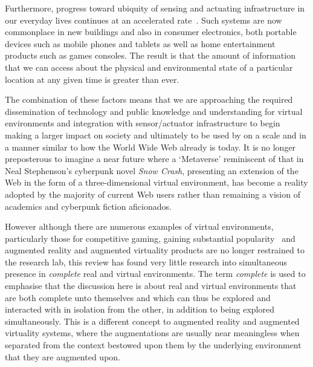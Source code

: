 Furthermore, progress toward ubiquity of sensing and actuating infrastructure in our everyday lives continues at an accelerated rate~\cite{Bose2009, Baronti2007}. Such systems are now commonplace in new buildings and also in consumer electronics, both portable devices such as mobile phones and tablets as well as home entertainment products such as games consoles. The result is that the amount of information that we can access about the physical and environmental state of a particular location at any given time is greater than ever.

The combination of these factors means that we are approaching the required dissemination of technology and public knowledge and understanding for virtual environments and integration with sensor/actuator infrastructure to begin making a larger impact on society and ultimately to be used by on a scale and in a manner similar to how the World Wide Web already is today. It is no longer preposterous to imagine a near future where a `Metaverse' reminiscent of that in Neal Stephenson's cyberpunk novel \textit{Snow Crash}, presenting an extension of the Web in the form of a three-dimensional virtual environment, has become a reality adopted by the majority of current Web users rather than remaining a vision of academics and cyberpunk fiction aficionados.

However although there are numerous examples of virtual environments, particularly those for competitive gaming, gaining substantial popularity~\cite{Sevan2008} and augmented reality and augmented virtuality products are no longer restrained to the research lab, this review has found very little research into simultaneous presence in \textit{complete} real and virtual environments. The term \textit{complete} is used to emphasise that the discussion here is about real and virtual environments that are both complete unto themselves and which can thus be explored and interacted with in isolation from the other, in addition to being explored simultaneously. This is a different concept to augmented reality and augmented virtuality systems, where the augmentations are usually near meaningless when separated from the context bestowed upon them by the underlying environment that they are augmented upon.

